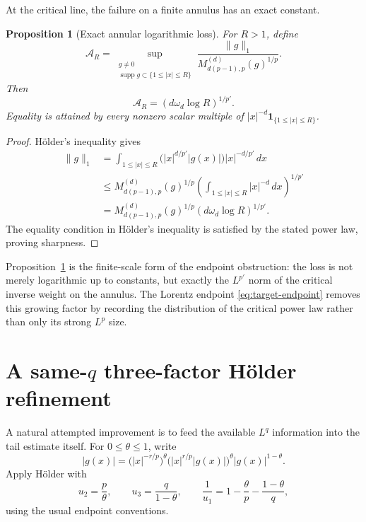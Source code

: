 \documentclass[11pt]{amsart}
\newtheorem{proposition}[theorem]{Proposition}
\theoremstyle{remark}
\newcommand{\norm}[1]{\lVert #1\rVert}
\newcommand{\ind}{\mathbf 1}
\renewcommand{\Mc}{M_{d(p-1),p}^{(d)}}
\begin{document}
At the critical line, the failure on a finite annulus has an exact constant.

\begin{proposition}[Exact annular logarithmic loss]\label{prop:annulus}
For $R>1$, define
\[
 \mathcal A_R=
 \sup_{\substack{g\ne0\\
 \operatorname{supp}g\subset\{1\le |x|\le R\}}}
 \frac{\norm{g}_1}{\Mc(g)^{1/p}}.
\]
Then
\begin{equation}\label{eq:annulus}
 \mathcal A_R=(d\omega_d\log R)^{1/p'}.
\end{equation}
Equality is attained by every nonzero scalar multiple of
$|x|^{-d}\ind_{\{1\le |x|\le R\}}$.
\end{proposition}

\begin{proof}
H\"older's inequality gives
\begin{align*}
 \norm{g}_1
 &=\int_{1\le|x|\le R}
   \bigl(|x|^{d/p'}|g(x)|\bigr)|x|^{-d/p'}\,dx\\
 &\le \Mc(g)^{1/p}
 \left(\int_{1\le|x|\le R}|x|^{-d}\,dx\right)^{1/p'}\\
 &=\Mc(g)^{1/p}(d\omega_d\log R)^{1/p'}.
\end{align*}
The equality condition in H\"older's inequality is satisfied by the stated
power law, proving sharpness.
\end{proof}

Proposition~\ref{prop:annulus} is the finite-scale form of the endpoint
obstruction: the loss is not merely logarithmic up to constants, but exactly
the $L^{p'}$ norm of the critical inverse weight on the annulus.  The
Lorentz endpoint \eqref{eq:target-endpoint} removes this growing factor by
recording the distribution of the critical power law rather than only its
strong $L^p$ size.

\section[A same-q three-factor Holder refinement]{A same-$q$ three-factor H\"older refinement}\label{sec:holder}

A natural attempted improvement is to feed the available $L^q$ information
into the tail estimate itself.  For $0\le\theta\le1$, write
\[
 |g(x)|
 =\bigl(|x|^{-r/p}\bigr)^\theta
  \bigl(|x|^{r/p}|g(x)|\bigr)^\theta
  |g(x)|^{1-\theta}.
\]
Apply H\"older with
\[
 u_2=\frac p\theta,
 \qquad
 u_3=\frac q{1-\theta},
 \qquad
 \frac1{u_1}=1-\frac\theta p-\frac{1-\theta}{q},
\]
using the usual endpoint conventions.
\end{document}
